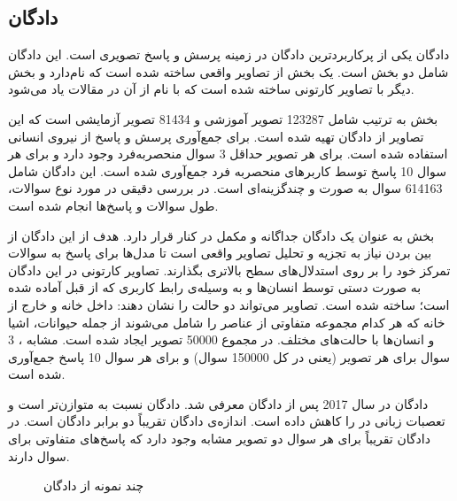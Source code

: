 \subsection{ دادگان }
دادگان
  \cite{antol2015vqa}
یکی از پرکاربردترین ‌‌دادگان در زمینه پرسش و پاسخ تصویری است. این دادگان شامل دو بخش است. یک بخش از تصاویر واقعی ساخته ‌شده ‌است که
 نام‌دارد و بخش دیگر با تصاویر کارتونی ساخته ‌شده ‌است که با نام 
 از آن در مقالات یاد می‌شود. 
 
 بخش
 به ترتیب شامل 123287 تصویر آموزشی و 81434 تصویر آزمایشی است که این تصاویر از ‌دادگان
 \cite{lin2014microsoft}
  تهیه شده است.  برای جمع‌آوری پرسش و پاسخ از نیروی انسانی استفاده ‌شده‌ است. برای هر تصویر حداقل 3 سوال منحصربه‌فرد وجود دارد و برای هر سوال 10 پاسخ توسط کاربرهای منحصربه فرد جمع‌آوری ‌شده ‌است. این دادگان شامل 614163 سوال به صورت 
  و چندگزینه‌ای است. در 
  \cite{antol2015vqa}
  بررسی دقیقی در مورد نوع سوالات، طول سوالات و پاسخ‌ها انجام ‌شده ‌است.
  
  بخش
 به عنوان یک ‌دادگان جداگانه و مکمل در کنار
 قرار دارد. هدف از این ‌دادگان از بین بردن نیاز به تجزیه و تحلیل تصاویر واقعی است تا مدل‌ها برای پاسخ به سوالات تمرکز خود را بر روی استدلال‌های سطح بالاتری بگذارند. تصاویر کارتونی در این دادگان به صورت دستی توسط انسان‌ها و به وسیله‌ی رابط کاربری که از قبل آماده ‌شده‌ است؛ ساخته ‌شده ‌است. تصاویر می‌تواند دو حالت را نشان‌ دهند: داخل خانه و خارج از خانه که هر کدام مجموعه متفاوتی از عناصر را شامل می‌شوند از جمله حیوانات، اشیا و انسان‌ها با حالت‌های مختلف. در مجموع 50000 تصویر ایجاد ‌شده ‌است. مشابه 
 ، 3 سوال برای هر تصویر (یعنی در کل 150000 سوال) و برای هر سوال 10 پاسخ  جمع‌آوری ‌شده ‌است.
 
 ‌دادگان 
 \cite{goyal2017making}
در سال 2017 پس از دادگان 
معرفی شد. دادگان
نسبت به 
متوازن‌تر است و تعصبات زبانی در 
را کاهش داده است. اندازه‌ی دادگان
تقریباً دو برابر ‌‌دادگان 
است. در دادگان
تقریباً برای هر سوال دو تصویر مشابه وجود دارد که پاسخ‌های متفاوتی برای سوال دارند.

  \begin{figure}
	\caption[چند نمونه ازدادگان  ]{چند نمونه از دادگان  \cite{antol2015vqa}}
	\label{fig:vqa1realExample}
  \end{figure}

